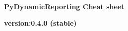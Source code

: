 \documentclass[9pt,landscape]{article}
\begin{document}
\raggedright
\footnotesize


\begin{center}
     \Huge{\textbf{PyDynamicReporting Cheat sheet}} \\
\end{center}
\begin{center}
  \small{\textbf{version:0.4.0 (stable)}} \\
\end{center}
\vspace{-0.15cm}
\noindent\makebox[\linewidth]{\rule{\paperwidth}{2pt}}
\end{document}
